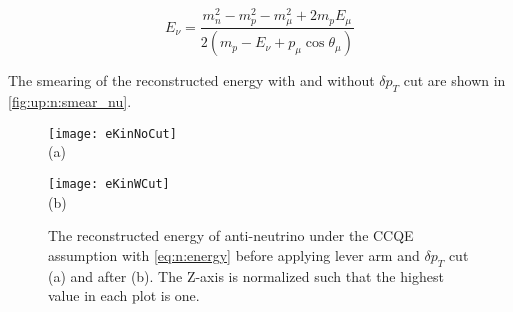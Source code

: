 \documentclass[main.tex]{subfiles}
\begin{document}
\begin{equation}
  \label{eq:n:energy}
  E_\nu=\frac{m^2_n-m^2_p-m^2_\mu+2m_p E_\mu}{2\left(m_p-E_\nu+p_\mu \cos\theta_\mu\right)}
\end{equation}

The smearing of the reconstructed energy with and without $\delta p_T$ cut are shown in \autoref{fig:up:n:smear_nu}.

\begin{figure}[!ht]
  \centering
  \begin{minipage}{0.4\linewidth}
    \centering
    \texttt{[image: eKinNoCut]} \\ (a)
  \end{minipage}
  \begin{minipage}{0.4\linewidth}
    \centering
    \texttt{[image: eKinWCut]} \\ (b)
  \end{minipage}
  \caption{The reconstructed energy of anti-neutrino under the CCQE assumption with \autoref{eq:n:energy} before applying lever arm and $\delta p_T$ cut (a) and after (b). The Z-axis is normalized such that the highest value in each plot is one.}
  \label{fig:up:n:smear_nu}
\end{figure}
\end{document}
